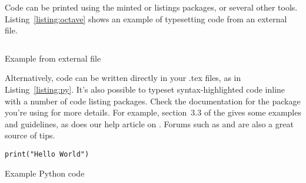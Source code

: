 Code can be printed using the minted or listings packages, or several other tools.
Listing~\ref{listing:octave} shows an example of typesetting code from an external file.

\begin{listing}
\inputminted{octave}{src/code/BitXorMatrix.m}
\caption{Example from external file}
\label{listing:octave}
\end{listing}

Alternatively, code can be written directly in your .tex files, as in Listing~\ref{listing:py}.
It's also possible to typeset syntax-highlighted code inline with a number of code listing packages.
Check the documentation for the package you're using for more details.
For example, section~3.3 of the  gives some examples and guidelines, as does our help article on . Forums such as  and  are also a great source of tips.

\begin{listing}
\begin{verbatim}
print("Hello World")
\end{verbatim}
\caption{Example Python code}
\label{listing:py}
\end{listing}